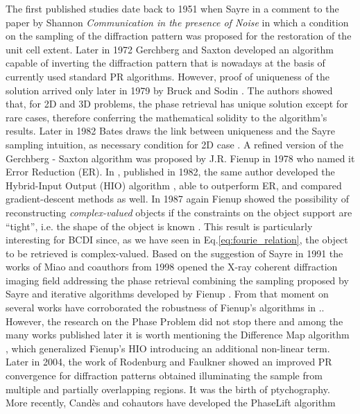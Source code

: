 The first published studies date back to 1951 when Sayre in a comment \cite{Sayre_1952} to the paper by 
Shannon \textit{Communication in the presence of Noise} \cite{Shannon_1949} in which a condition on the sampling of the diffraction 
pattern was proposed for the restoration of the unit cell extent. Later in 1972 Gerchberg and Saxton \cite{gerchberg1972} developed an 
algorithm capable of inverting the diffraction pattern that is nowadays at the basis of currently used standard PR algorithms. 
However, proof of uniqueness of the solution arrived only later in 1979 by Bruck and Sodin \cite{BruckSodin1979}. 
The authors showed that, for 2D and 3D problems, the phase retrieval has unique solution except for rare cases, therefore conferring the mathematical solidity to the algorithm's results. Later in 1982 Bates draws the link between uniqueness and 
the Sayre sampling intuition, as necessary condition for 2D case \cite{Bates1982}. A refined version of the Gerchberg - Saxton algorithm 
was proposed by J.R. Fienup in 1978 \cite{fienup_reconstruction_1978}
who named it Error Reduction (ER). In \cite{fienup_phase_1982}, published in 1982, the same author developed the Hybrid-Input Output (HIO) algorithm , 
able to outperform ER, and compared gradient-descent methods as well. In 1987 again Fienup showed the possibility of reconstructing 
\textit{complex-valued} objects if the constraints on the object support are ``tight'', i.e. the shape of the object 
is known \cite{Fienup1987}. This result is particularly interesting for BCDI since, as we have seen in Eq.\ref{eq:fourie_relation}, 
the object to be retrieved is complex-valued. 
Based on the suggestion of Sayre in 1991 \cite{sayre1991direct} the works of Miao and coauthors from 1998 
opened the X-ray coherent diffraction imaging field addressing the phase retrieval combining the sampling proposed by Sayre and
iterative algorithms developed by Fienup \cite{Miao1998, Miao1999, Miao2000}. 
From that moment on several works have corroborated the robustness of Fienup's algorithms in .. 
However, the research on the Phase Problem did not stop there and among the many works published later it is worth 
mentioning the Difference Map algorithm \cite{Elser2003}, which generalized Fienup's HIO introducing an additional 
non-linear term. Later in 2004, the work of Rodenburg and Faulkner \cite{RodenburgFaulkner2004} showed an improved
PR convergence for diffraction patterns obtained illuminating the sample from multiple and partially overlapping regions. 
It was the birth of ptychography. More recently, Cand{\`e}s and cohautors have developed the PhaseLift algorithm \cite{CandesStrohmerVoroninski2013} 
